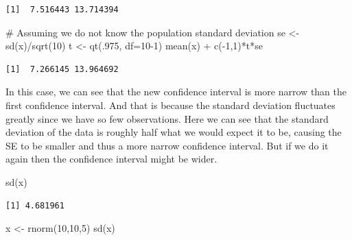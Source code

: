 \documentclass[
  letterpaper,
  DIV=11,
  numbers=noendperiod]{scrreprt}
\newenvironment{Shaded}{\begin{snugshade}}{\end{snugshade}}
\newcommand{\AttributeTok}[1]{\textcolor[rgb]{0.40,0.45,0.13}{#1}}
\newcommand{\CommentTok}[1]{\textcolor[rgb]{0.37,0.37,0.37}{#1}}
\newcommand{\DecValTok}[1]{\textcolor[rgb]{0.68,0.00,0.00}{#1}}
\newcommand{\FunctionTok}[1]{\textcolor[rgb]{0.28,0.35,0.67}{#1}}
\newcommand{\NormalTok}[1]{\textcolor[rgb]{0.00,0.23,0.31}{#1}}
\newcommand{\OtherTok}[1]{\textcolor[rgb]{0.00,0.23,0.31}{#1}}
\newcommand{\SpecialCharTok}[1]{\textcolor[rgb]{0.37,0.37,0.37}{#1}}
\begin{document}
\begin{verbatim}
[1]  7.516443 13.714394
\end{verbatim}

\begin{Shaded}
\begin{Highlighting}[]
\CommentTok{\# Assuming we do not know the population standard deviation}
\NormalTok{se }\OtherTok{\textless{}{-}} \FunctionTok{sd}\NormalTok{(x)}\SpecialCharTok{/}\FunctionTok{sqrt}\NormalTok{(}\DecValTok{10}\NormalTok{)}
\NormalTok{t }\OtherTok{\textless{}{-}} \FunctionTok{qt}\NormalTok{(.}\DecValTok{975}\NormalTok{, }\AttributeTok{df=}\DecValTok{10{-}1}\NormalTok{)}
\FunctionTok{mean}\NormalTok{(x) }\SpecialCharTok{+} \FunctionTok{c}\NormalTok{(}\SpecialCharTok{{-}}\DecValTok{1}\NormalTok{,}\DecValTok{1}\NormalTok{)}\SpecialCharTok{*}\NormalTok{t}\SpecialCharTok{*}\NormalTok{se}
\end{Highlighting}
\end{Shaded}

\begin{verbatim}
[1]  7.266145 13.964692
\end{verbatim}

In this case, we can see that the new confidence interval is more narrow
than the first confidence interval. And that is because the standard
deviation fluctuates greatly since we have so few observations. Here we
can see that the standard deviation of the data is roughly half what we
would expect it to be, causing the SE to be smaller and thus a more
narrow confidence interval. But if we do it again then the confidence
interval might be wider.

\begin{Shaded}
\begin{Highlighting}[]
\FunctionTok{sd}\NormalTok{(x)}
\end{Highlighting}
\end{Shaded}

\begin{verbatim}
[1] 4.681961
\end{verbatim}

\begin{Shaded}
\begin{Highlighting}[]
\NormalTok{x }\OtherTok{\textless{}{-}} \FunctionTok{rnorm}\NormalTok{(}\DecValTok{10}\NormalTok{,}\DecValTok{10}\NormalTok{,}\DecValTok{5}\NormalTok{)}
\FunctionTok{sd}\NormalTok{(x)}
\end{Highlighting}
\end{Shaded}
\end{document}
